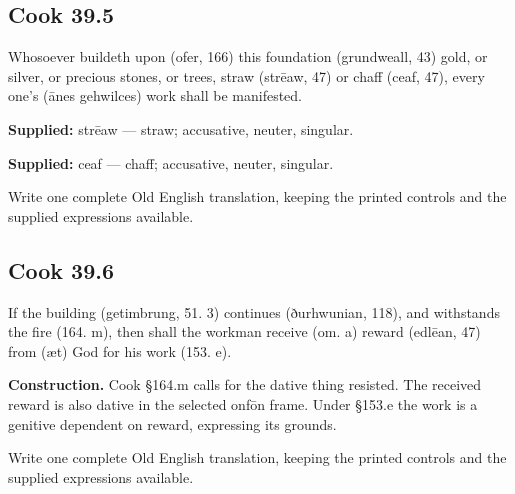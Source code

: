 \par\begin{minipage}{\linewidth}\raggedright
\subsection*{Cook 39.5}

Whosoever buildeth upon (ofer, 166) this foundation (grundweall, 43) gold, or silver, or precious stones, or trees, straw (strēaw, 47) or chaff (ceaf, 47), every one’s (ānes gehwilces) work shall be manifested.

\end{minipage}\par\addvspace{4pt}

\textbf{Supplied:} strēaw — straw; accusative, neuter, singular.

\textbf{Supplied:} ceaf — chaff; accusative, neuter, singular.

Write one complete Old English translation, keeping the printed controls and the supplied expressions available.

\par\begin{minipage}{\linewidth}\raggedright
\subsection*{Cook 39.6}

If the building (getimbrung, 51. 3) continues (ðurhwunian, 118), and withstands the fire (164. m), then shall the workman receive (om. a) reward (edlēan, 47) from (æt) God for his work (153. e).

\textbf{Construction.} Cook §164.m calls for the dative thing resisted. The received reward is also dative in the selected onfōn frame. Under §153.e the work is a genitive dependent on reward, expressing its grounds.

Write one complete Old English translation, keeping the printed controls and the supplied expressions available.

\end{minipage}\par\addvspace{4pt}

